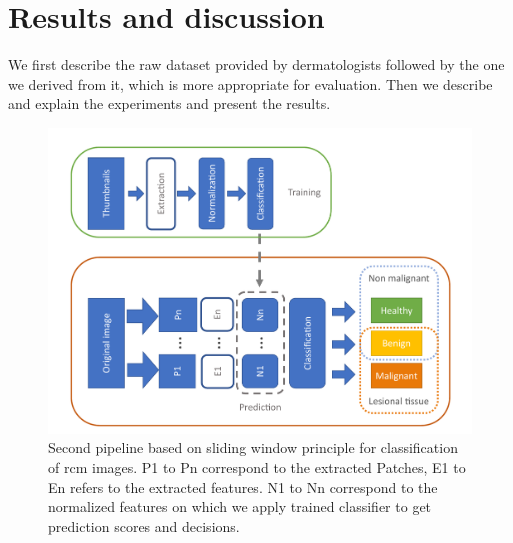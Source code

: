 \section{Results and discussion}
\label{results}
We first describe the raw dataset provided by dermatologists followed by the one we derived from it, which is more appropriate for evaluation. Then we describe and explain the experiments and present the results.\par
\begin{figure}[H]
    \begin{center}
        \includegraphics[width=\linewidth]{content/figures/Sliding.pdf}
        \caption{Second pipeline based on sliding window principle for classification of \ac{rcm} images. P1 to Pn correspond to the extracted Patches, E1 to En refers to the extracted features. N1 to Nn correspond to the normalized features on which we apply trained classifier to get prediction scores and decisions.}
        \label{sliding}
    \end{center} 
\end{figure}
